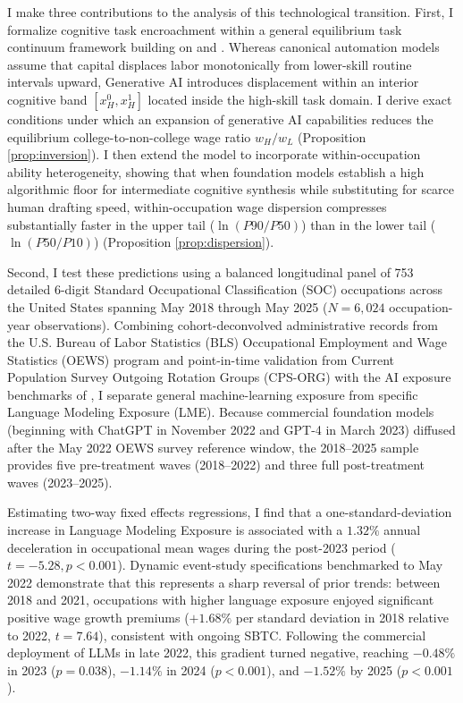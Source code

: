 \documentclass[12pt]{article}
\begin{document}
I make three contributions to the analysis of this technological transition. First, I formalize cognitive task encroachment within a general equilibrium task continuum framework building on \citet{acemogluAutor2011} and \citet{acemogluRestrepo2018, acemogluRestrepo2022}. Whereas canonical automation models assume that capital displaces labor monotonically from lower-skill routine intervals upward, Generative AI introduces displacement within an interior cognitive band $[x_H^0, x_H^1]$ located inside the high-skill task domain. I derive exact conditions under which an expansion of generative AI capabilities reduces the equilibrium college-to-non-college wage ratio $w_H / w_L$ (Proposition \ref{prop:inversion}). I then extend the model to incorporate within-occupation ability heterogeneity, showing that when foundation models establish a high algorithmic floor for intermediate cognitive synthesis while substituting for scarce human drafting speed, within-occupation wage dispersion compresses substantially faster in the upper tail ($\ln(P90/P50)$) than in the lower tail ($\ln(P50/P10)$) (Proposition \ref{prop:dispersion}).

Second, I test these predictions using a balanced longitudinal panel of 753 detailed 6-digit Standard Occupational Classification (SOC) occupations across the United States spanning May 2018 through May 2025 ($N = 6,024$ occupation-year observations). Combining cohort-deconvolved administrative records from the U.S. Bureau of Labor Statistics (BLS) Occupational Employment and Wage Statistics (OEWS) program and point-in-time validation from Current Population Survey Outgoing Rotation Groups (CPS-ORG) with the AI exposure benchmarks of \citet{felten2021, felten2023}, I separate general machine-learning exposure from specific Language Modeling Exposure (LME). Because commercial foundation models (beginning with ChatGPT in November 2022 and GPT-4 in March 2023) diffused after the May 2022 OEWS survey reference window, the 2018--2025 sample provides five pre-treatment waves (2018--2022) and three full post-treatment waves (2023--2025).

Estimating two-way fixed effects regressions, I find that a one-standard-deviation increase in Language Modeling Exposure is associated with a $1.32\%$ annual deceleration in occupational mean wages during the post-2023 period ($t = -5.28, p < 0.001$). Dynamic event-study specifications benchmarked to May 2022 demonstrate that this represents a sharp reversal of prior trends: between 2018 and 2021, occupations with higher language exposure enjoyed significant positive wage growth premiums ($+1.68\%$ per standard deviation in 2018 relative to 2022, $t = 7.64$), consistent with ongoing SBTC. Following the commercial deployment of LLMs in late 2022, this gradient turned negative, reaching $-0.48\%$ in 2023 ($p = 0.038$), $-1.14\%$ in 2024 ($p < 0.001$), and $-1.52\%$ by 2025 ($p < 0.001$).
\end{document}
